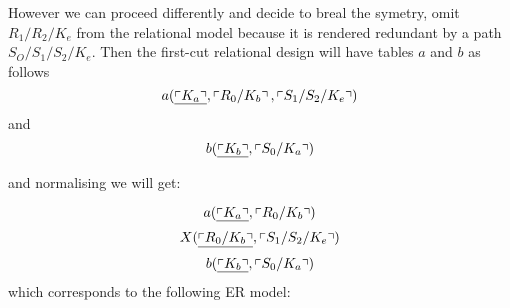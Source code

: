 However we can proceed differently and decide to breal the symetry, omit $R_1/R_2/K_e$  from the relational 
model because it is rendered redundant by a path $S_O/S_1/S_2/K_e$. Then the first-cut relational design will have tables $a$ and $b$ as follows
\begin{equation}
\label{relationa}
a(\underline{\left\ulcorner K_a\right\urcorner},\left\ulcorner R_0/K_b\right\urcorner,\left\ulcorner S_1/S_2/K_e\right\urcorner)
\end{equation}
and
\begin{equation}
\label{relationb}
b(\underline{\left\ulcorner K_b\right\urcorner},\left\ulcorner S_0/K_a\right\urcorner)
\end{equation}

and normalising we will get:

\begin{equation}
\label{normalrelationa}
a(\underline{\left\ulcorner K_a\right\urcorner},\left\ulcorner R_0/K_b\right\urcorner)
\end{equation}
\begin{equation}
\label{relationX}
X(\underline{\left\ulcorner R_0/K_b\right\urcorner},\left\ulcorner S_1/S_2/K_e\right\urcorner)
\end{equation}
\begin{equation}
\label{normalrelationb}
b(\underline{\left\ulcorner K_b\right\urcorner},\left\ulcorner S_0/K_a\right\urcorner)
\end{equation}
which corresponds to the following ER model:


